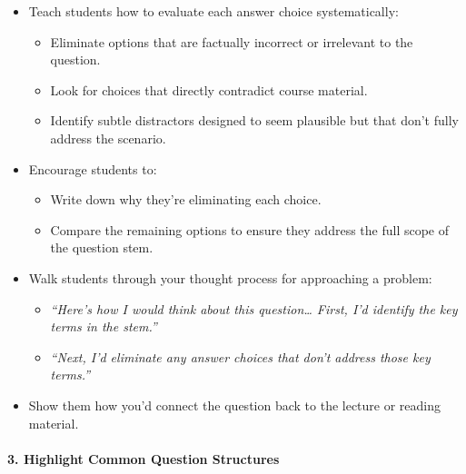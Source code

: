 \documentclass[
]{article}
\providecommand{\tightlist}{%
  \setlength{\itemsep}{0pt}\setlength{\parskip}{0pt}}
\begin{document}
\begin{itemize}
\tightlist
\item
  Teach students how to evaluate each answer choice systematically:

  \begin{itemize}
  \tightlist
  \item
    Eliminate options that are factually incorrect or irrelevant to the question.
  \item
    Look for choices that directly contradict course material.
  \item
    Identify subtle distractors designed to seem plausible but that don't fully address the scenario.
  \end{itemize}
\item
  Encourage students to:

  \begin{itemize}
  \tightlist
  \item
    Write down why they're eliminating each choice.
  \item
    Compare the remaining options to ensure they address the full scope of the question stem.
  \end{itemize}
\item
  Walk students through your thought process for approaching a problem:

  \begin{itemize}
  \tightlist
  \item
    \emph{``Here's how I would think about this question\ldots{} First, I'd identify the key terms in the stem.''}
  \item
    \emph{``Next, I'd eliminate any answer choices that don't address those key terms.''}
  \end{itemize}
\item
  Show them how you'd connect the question back to the lecture or reading material.
\end{itemize}

\hypertarget{highlight-common-question-structures}{%
\paragraph*{3. Highlight Common Question Structures}\label{highlight-common-question-structures}}
\end{document}
